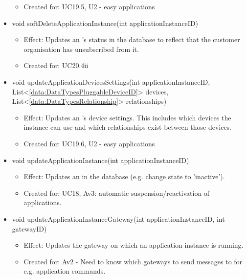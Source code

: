 \begin{description}
\begin{itemize}[noitemsep,nolistsep,leftmargin=-.25cm]
\begin{itemize}[noitemsep,nolistsep]
\item Created for: UC19.5, U2 - easy applications
        \end{itemize}
      \item \textsf{void softDeleteApplicationInstance(int applicationInstanceID)}
        \begin{itemize}[noitemsep,nolistsep]
           \item Effect: Updates an 's status in the database to reflect that the customer organisation has unsubscribed from it.
\item Created for: UC20.4ii
        \end{itemize}
      \item \textsf{void updateApplicationDevicesSettings(int applicationInstanceID, List\textless{}\ref{data:DataTypesPluggableDeviceID}\textgreater{} devices, List\textless{}\ref{data:DataTypesRelationship}\textgreater{} relationships)}
        \begin{itemize}[noitemsep,nolistsep]
           \item Effect: Updates an 's device settings. This includes which devices the instance can use and which relationships exist between those devices.
\item Created for: UC19.6, U2 - easy applications
        \end{itemize}
      \item \textsf{void updateApplicationInstance(int applicationInstanceID)}
        \begin{itemize}[noitemsep,nolistsep]
           \item Effect: Updates an  in the database (e.g. change state to 'inactive').
\item Created for: UC18, Av3: automatic suspension/reactivation of applications.
        \end{itemize}
      \item \textsf{void updateApplicationInstanceGateway(int applicationInstanceID, int gatewayID)}
        \begin{itemize}[noitemsep,nolistsep]
           \item Effect: Updates the gateway on which an application instance is running.
\item Created for: Av2 - Need to know which gateways to send messages to for e.g. application commands.

\end{itemize}
\end{itemize}
\end{description}
